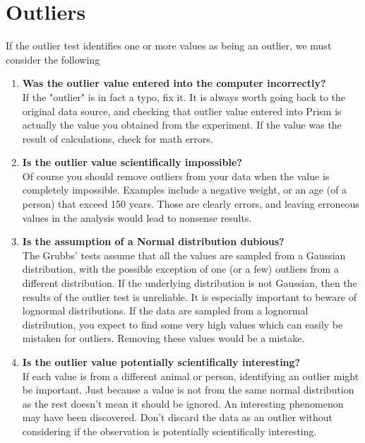 


\section{Outliers}
If the outlier test identifies one or more values as being an outlier, we must consider the following

\begin{enumerate}
\item	\textbf{Was the outlier value entered into the computer incorrectly?}\\
If the "outlier" is in fact a typo, fix it. It is always worth going back to the original data source, and checking that outlier value entered into Prism is actually the value you obtained from the experiment. If the value was the result of calculations, check for math errors.

\item\textbf{	Is the outlier value scientifically impossible?}\\
Of course you should remove outliers from your data when the value is completely impossible. Examples include a negative weight, or an age (of a person) that exceed 150 years. Those are clearly errors, and leaving erroneous values in the analysis would lead to nonsense results.

\item	\textbf{Is the assumption of a Normal distribution dubious?}\\
The Grubbs' tests assume that all the values are sampled from a Gaussian distribution, with the possible exception of one (or a few) outliers from a different distribution. If the underlying distribution is not Gaussian, then the results of the outlier test is unreliable. It is especially important to beware of lognormal distributions. If the data are sampled from a lognormal distribution, you expect to find some very high values which can easily be mistaken for outliers. Removing these values would be a mistake.

\item	\textbf{Is the outlier value potentially scientifically interesting?}\\
If each value is from a different animal or person, identifying an outlier might be important. Just because a value is not from the same normal distribution as the rest doesn't mean it should be ignored. An interesting phenomenon may have been discovered. Don't discard  the data as an outlier without considering if the observation is potentially scientifically interesting. 


\end{enumerate}
